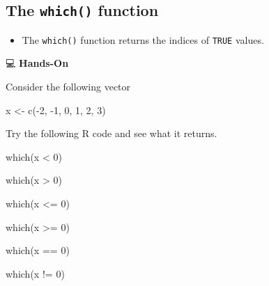 \documentclass[
  letterpaper,
  DIV=11,
  numbers=noendperiod]{scrreprt}
\newenvironment{Shaded}{\begin{snugshade}}{\end{snugshade}}
\newcommand{\DecValTok}[1]{\textcolor[rgb]{0.68,0.00,0.00}{#1}}
\newcommand{\FunctionTok}[1]{\textcolor[rgb]{0.28,0.35,0.67}{#1}}
\newcommand{\NormalTok}[1]{\textcolor[rgb]{0.00,0.23,0.31}{#1}}
\newcommand{\OtherTok}[1]{\textcolor[rgb]{0.00,0.23,0.31}{#1}}
\newcommand{\SpecialCharTok}[1]{\textcolor[rgb]{0.37,0.37,0.37}{#1}}
\providecommand{\tightlist}{%
  \setlength{\itemsep}{0pt}\setlength{\parskip}{0pt}}\usepackage{longtable,booktabs,array}
\begin{document}
\subsection{\texorpdfstring{The \texttt{which()}
function}{The which() function}}\label{the-which-function}

\begin{itemize}
\tightlist
\item
  The \texttt{which()} function returns the indices of \texttt{TRUE}
  values.
\end{itemize}

💻 \textbf{Hands-On}

Consider the following vector

\begin{Shaded}
\begin{Highlighting}[]
\NormalTok{x }\OtherTok{\textless{}{-}} \FunctionTok{c}\NormalTok{(}\SpecialCharTok{{-}}\DecValTok{2}\NormalTok{, }\SpecialCharTok{{-}}\DecValTok{1}\NormalTok{, }\DecValTok{0}\NormalTok{, }\DecValTok{1}\NormalTok{, }\DecValTok{2}\NormalTok{, }\DecValTok{3}\NormalTok{)}
\end{Highlighting}
\end{Shaded}

Try the following R code and see what it returns.

\begin{Shaded}
\begin{Highlighting}[]
\FunctionTok{which}\NormalTok{(x }\SpecialCharTok{\textless{}} \DecValTok{0}\NormalTok{)}

\FunctionTok{which}\NormalTok{(x }\SpecialCharTok{\textgreater{}} \DecValTok{0}\NormalTok{)}
 
\FunctionTok{which}\NormalTok{(x }\SpecialCharTok{\textless{}=} \DecValTok{0}\NormalTok{)}
 
\FunctionTok{which}\NormalTok{(x }\SpecialCharTok{\textgreater{}=} \DecValTok{0}\NormalTok{)}

\FunctionTok{which}\NormalTok{(x }\SpecialCharTok{==} \DecValTok{0}\NormalTok{)}

\FunctionTok{which}\NormalTok{(x }\SpecialCharTok{!=} \DecValTok{0}\NormalTok{)}
\end{Highlighting}
\end{Shaded}
\end{document}
